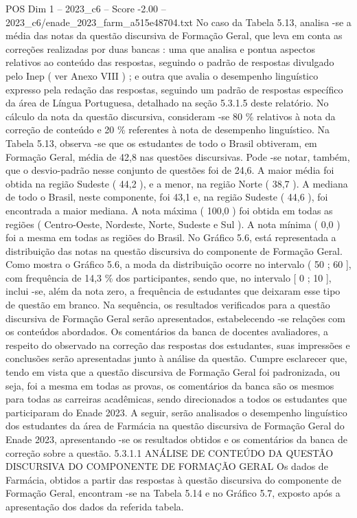 \begin{textsample}{POS Dim 1 – 2023\_c6 – Score -2.00 – 2023\_c6/enade\_2023\_farm\_a515e48704.txt}
No caso da Tabela 5.13, analisa -se a média das notas da questão discursiva de Formação Geral, que leva em conta as correções realizadas por duas bancas : uma que analisa e pontua aspectos relativos ao conteúdo das respostas, seguindo o padrão de respostas divulgado pelo Inep ( ver Anexo VIII ) ; e outra que avalia o desempenho linguístico expresso pela redação das respostas, seguindo um padrão de respostas específico da área de Língua Portuguesa, detalhado na seção 5.3.1.5 deste relatório.
No cálculo da nota da questão discursiva, consideram -se 80 \% relativos à nota da correção de conteúdo e 20 \% referentes à nota de desempenho linguístico.
Na Tabela 5.13, observa -se que os estudantes de todo o Brasil obtiveram, em Formação Geral, média de 42,8 nas questões discursivas.
Pode -se notar, também, que o desvio-padrão nesse conjunto de questões foi de 24,6.
A maior média foi obtida na região Sudeste ( 44,2 ), e a menor, na região Norte ( 38,7 ).
A mediana de todo o Brasil, neste componente, foi 43,1 e, na região Sudeste ( 44,6 ), foi encontrada a maior mediana.
A nota máxima ( 100,0 ) foi obtida em todas as regiões ( Centro-Oeste, Nordeste, Norte, Sudeste e Sul ).
A nota mínima ( 0,0 ) foi a mesma em todas as regiões do Brasil.
No Gráfico 5.6, está representada a distribuição das notas na questão discursiva do componente de Formação Geral.
Como mostra o Gráfico 5.6, a moda da distribuição ocorre no intervalo ( 50 ; 60 ], com frequência de 14,3 \% dos participantes, sendo que, no intervalo [ 0 ; 10 ], inclui -se, além da nota zero, a frequência de estudantes que deixaram esse tipo de questão em branco.
Na sequência, os resultados verificados para a questão discursiva de Formação Geral serão apresentados, estabelecendo -se relações com os conteúdos abordados.
Os comentários da banca de docentes avaliadores, a respeito do observado na correção das respostas dos estudantes, suas impressões e conclusões serão apresentadas junto à análise da questão.
Cumpre esclarecer que, tendo em vista que a questão discursiva de Formação Geral foi padronizada, ou seja, foi a mesma em todas as provas, os comentários da banca são os mesmos para todas as carreiras acadêmicas, sendo direcionados a todos os estudantes que participaram do Enade 2023.
A seguir, serão analisados o desempenho linguístico dos estudantes da área de Farmácia na questão discursiva de Formação Geral do Enade 2023, apresentando -se os resultados obtidos e os comentários da banca de correção sobre a questão. 5.3.1.1 ANÁLISE DE CONTEÚDO DA QUESTÃO DISCURSIVA DO COMPONENTE DE FORMAÇÃO GERAL Os dados de Farmácia, obtidos a partir das respostas à questão discursiva do componente de Formação Geral, encontram -se na Tabela 5.14 e no Gráfico 5.7, exposto após a apresentação dos dados da referida tabela.

\end{textsample}
